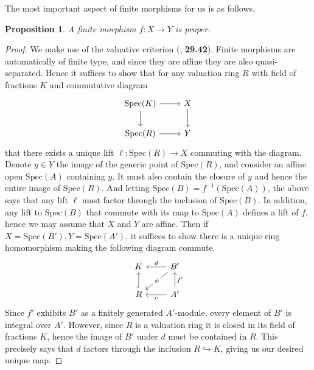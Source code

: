 \documentclass{article}
\theoremstyle{definition}
\theoremstyle{remark}
\theoremstyle{plain}
\newtheorem{proposition}[theorem]{Proposition}
\begin{document}
The most important aspect of finite morphisms for us is as follows.
\begin{proposition}
	A finite morphism $f: X \to Y$ is proper. 
\end{proposition}
\begin{proof}
	We make use of the valuative criterion (\cite{stacks-project}, \textbf{29.42}).
	Finite morphisms are automatically of finite type, and since they are affine they are also quasi-separated.
	Hence it suffices to show that for any valuation ring $R$ with field of fractions $K$ and commutative diagram
\[\begin{tikzcd}
	{\text{Spec}(K)} & X \\
	{\text{Spec}(R)} & Y
	\arrow[from=1-1, to=1-2]
	\arrow[from=1-1, to=2-1]
	\arrow[from=1-2, to=2-2]
	\arrow[from=2-1, to=2-2]
\end{tikzcd}\]
that there exists a unique lift $\ell: \text{Spec}(R) \to X$ commuting with the diagram.
Denote $y \in Y$ the image of the generic point of $\text{Spec}(R)$, and consider an affine open $\text{Spec}(A)$ containing $y$.
It must also contain the closure of $y$ and hence the entire image of $\text{Spec}(R)$.
And letting $\text{Spec}(B) = f^{-1}(\text{Spec}(A))$, the above says that any lift $\ell$ must factor through the inclusion of $\text{Spec}(B)$.
In addition, any lift to $\text{Spec}(B)$ that commute with its map to $\text{Spec}(A)$ defines a lift of $f$, hence we may assume that $X$ and $Y$ are affine.
Then if $X = \text{Spec}(B'), Y = \text{Spec}(A')$, it suffices to show there is a unique ring homomorphism making the following diagram commute.
\[\begin{tikzcd}
	K & {B'} \\
	R & {A'}
	\arrow["d"', from=1-2, to=1-1]
	\arrow["\phi"{description}, from=1-2, to=2-1]
	\arrow[hook, from=2-1, to=1-1]
	\arrow["{f'}"', from=2-2, to=1-2]
	\arrow["c", from=2-2, to=2-1]
\end{tikzcd}\]
Since $f'$ exhibits $B'$ as a finitely generated $A'$-module, every element of $B'$ is integral over $A'$.
However, since $R$ is a valuation ring it is closed in its field of fractions $K$, hence the image of $B'$ under $d$ must be contained in $R$.
This precisely says that $d$ factors through the inclusion $R \hookrightarrow K$, giving us our desired unique map.
\end{proof}
\end{document}
